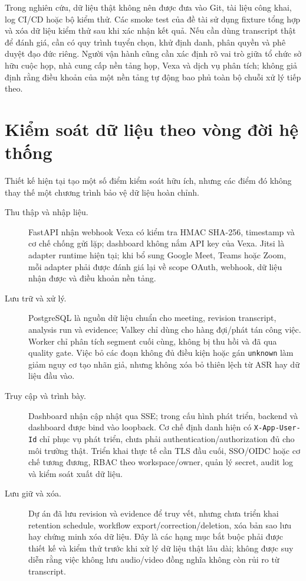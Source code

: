 Trong nghiên cứu, dữ liệu thật không nên được đưa vào Git, tài liệu công khai, log CI/CD hoặc bộ kiểm thử. Các smoke test của đề tài sử dụng fixture tổng hợp và xóa dữ liệu kiểm thử sau khi xác nhận kết quả. Nếu cần dùng transcript thật để đánh giá, cần có quy trình tuyển chọn, khử định danh, phân quyền và phê duyệt đạo đức riêng. Người vận hành cũng cần xác định rõ vai trò giữa tổ chức sở hữu cuộc họp, nhà cung cấp nền tảng họp, Vexa và dịch vụ phân tích; không giả định rằng điều khoản của một nền tảng tự động bao phủ toàn bộ chuỗi xử lý tiếp theo.

\section{Kiểm soát dữ liệu theo vòng đời hệ thống}
Thiết kế hiện tại tạo một số điểm kiểm soát hữu ích, nhưng các điểm đó không thay thế một chương trình bảo vệ dữ liệu hoàn chỉnh.

\begin{description}
  \item[Thu thập và nhập liệu.] FastAPI nhận webhook Vexa có kiểm tra HMAC SHA-256, timestamp và cơ chế chống gửi lặp; dashboard không nắm API key của Vexa. Jitsi là adapter runtime hiện tại; khi bổ sung Google Meet, Teams hoặc Zoom, mỗi adapter phải được đánh giá lại về scope OAuth, webhook, dữ liệu nhận được và điều khoản nền tảng.
  \item[Lưu trữ và xử lý.] PostgreSQL là nguồn dữ liệu chuẩn cho meeting, revision transcript, analysis run và evidence; Valkey chỉ dùng cho hàng đợi/phát tán công việc. Worker chỉ phân tích segment cuối cùng, không bị thu hồi và đã qua quality gate. Việc bỏ các đoạn không đủ điều kiện hoặc gán \texttt{unknown} làm giảm nguy cơ tạo nhãn giả, nhưng không xóa bỏ thiên lệch từ ASR hay dữ liệu đầu vào.
  \item[Truy cập và trình bày.] Dashboard nhận cập nhật qua SSE; trong cấu hình phát triển, backend và dashboard được bind vào loopback. Cơ chế định danh hiện có \texttt{X-App-User-Id} chỉ phục vụ phát triển, chưa phải authentication/authorization đủ cho môi trường thật. Triển khai thực tế cần TLS đầu cuối, SSO/OIDC hoặc cơ chế tương đương, RBAC theo workspace/owner, quản lý secret, audit log và kiểm soát xuất dữ liệu.
  \item[Lưu giữ và xóa.] Dự án đã lưu revision và evidence để truy vết, nhưng chưa triển khai retention schedule, workflow export/correction/deletion, xóa bản sao lưu hay chứng minh xóa dữ liệu. Đây là các hạng mục bắt buộc phải được thiết kế và kiểm thử trước khi xử lý dữ liệu thật lâu dài; không được suy diễn rằng việc không lưu audio/video đồng nghĩa không còn rủi ro từ transcript.
\end{description}

